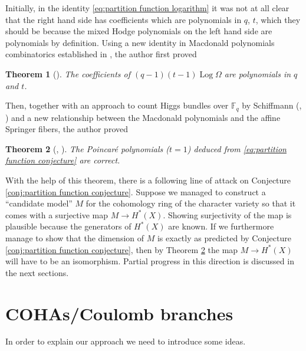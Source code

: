 \documentclass[12pt]{amsart}
\newtheorem{theorem}{Theorem}[section]
\theoremstyle{definition}
\theoremstyle{remark}
\numberwithin{equation}{section}
\begin{document}
	Initially, in the identity \eqref{eq:partition function logarithm} it was not at all clear that the right hand side has coefficients which are polynomials in $q$, $t$, which they should be because the mixed Hodge polynomials on the left hand side are polynomials by definition.	
	Using a new identity in Macdonald polynomials combinatorics established in \cite{garsia2019five}, the author first proved
	\begin{theorem}[\cite{mellit2018integrality}]
		The coefficients of $(q-1)(t-1)\; \mathrm{Log}\;\Omega$ are polynomials in $q$ and $t$.
	\end{theorem}
	
	Then, together with an approach to count Higgs bundles over $\mathbb{F}_q$ by Schiffmann (\cite{schiffmann2016indecomposable}, \cite{mozgovoy2020counting}) and a new relationship between the Macdonald polynomials and the affine Springer fibers, the author proved
	\begin{theorem}[\cite{mellit2020poincare}, \cite{mellit2020poincarea}]\label{thm:poincare}
		The Poincar\'e polynomials ($t=1$) deduced from \eqref{eq:partition function conjecture} are correct.
	\end{theorem}
	
	With the help of this theorem, there is a following line of attack on Conjecture \eqref{conj:partition function conjecture}. Suppose we managed to construct a ``candidate model'' $M$ for the cohomology ring of the character variety so that it comes with a surjective map $M\to H^*(X)$. Showing surjectivity of the map is plausible because the generators of $H^*(X)$ are known. If we furthermore manage to show that the dimension of $M$ is exactly as predicted by Conjecture \eqref{conj:partition function conjecture}, then by Theorem \ref{thm:poincare} the map $M\to H^*(X)$ will have to be an isomorphism. Partial progress in this direction is discussed in the next sections.
	
	
	\section{COHAs/Coulomb branches}
	
	In order to explain our approach we need to introduce some ideas.
\end{document}
